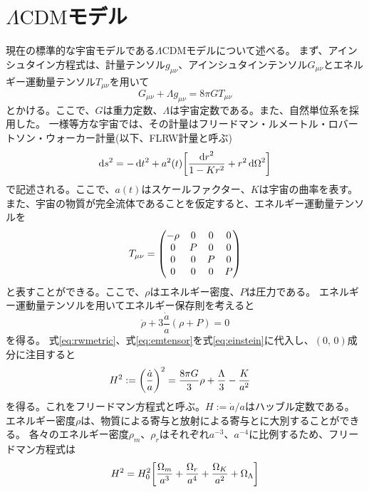 \documentclass[../../main.tex]{subfiles}
\begin{document}
\section{$\Lambda\mathrm{CDM}$モデル}
現在の標準的な宇宙モデルである$\Lambda\mathrm{CDM}$モデルについて述べる。
まず、アインシュタイン方程式は、計量テンソル$g_{\mu\nu}$、アインシュタインテンソル$G_{\mu\nu}$とエネルギー運動量テンソル$T_{\mu\nu}$を用いて
\begin{equation}
    \label{eq:einstein}
    G_{\mu\nu}+\Lambda g_{\mu\nu}=8\pi GT_{\mu\nu}
\end{equation}
とかける。ここで、$G$は重力定数、$\Lambda$は宇宙定数である。また、自然単位系を採用した。
一様等方な宇宙では、その計量はフリードマン・ルメートル・ロバートソン・ウォーカー計量(以下、FLRW計量と呼ぶ)
\begin{equation}
    \label{eq:rwmetric}
    \dd{s}^2=-\dd{t}^2+a^2(t)\qty[\frac{\dd{r}^2}{1-Kr^2}+r^2\dd{\Omega}^2]
\end{equation}
で記述される。ここで、$a(t)$はスケールファクター、$K$は宇宙の曲率を表す。
また、宇宙の物質が完全流体であることを仮定すると、エネルギー運動量テンソルを
\begin{equation}
    \label{eq:emtensor}
    T_{\mu\nu}=\mqty(-\rho&0&0&0\\0&P&0&0\\0&0&P&0\\0&0&0&P)
\end{equation}
と表すことができる。ここで、$\rho$はエネルギー密度、$P$は圧力である。
エネルギー運動量テンソルを用いてエネルギー保存則を考えると
\begin{equation}
    \label{eq:energyconservation}
    \dot{\rho}+3\dfrac{\dot{a}}{a}(\rho+P)=0
\end{equation}
を得る。
式\eqref{eq:rwmetric}、式\eqref{eq:emtensor}を式\eqref{eq:einstein}に代入し、$(0,\,0)$成分に注目すると
\begin{align}
    \label{eq:friedmann}
    H^2:=\qty(\dfrac{\dot{a}}{a})^2 &= \dfrac{8\pi G}{3}\rho+\dfrac{\Lambda}{3}-\dfrac{K}{a^2}
\end{align}
を得る。これをフリードマン方程式と呼ぶ。$H:=\dot{a}/a$はハッブル定数である。
エネルギー密度$\rho$は、物質による寄与と放射による寄与とに大別することができる。
各々のエネルギー密度$\rho_m$、$\rho_r$はそれぞれ$a^{-3}$、$a^{-4}$に比例するため、フリードマン方程式は
\begin{equation}
    \label{eq:friedmann2}
    H^2=H_0^2\qty[\dfrac{\Omega_m}{a^3}+\dfrac{\Omega_r}{a^4}+\dfrac{\Omega_{K}}{a^2}+\Omega_{\Lambda}]
\end{equation}
\end{document}
